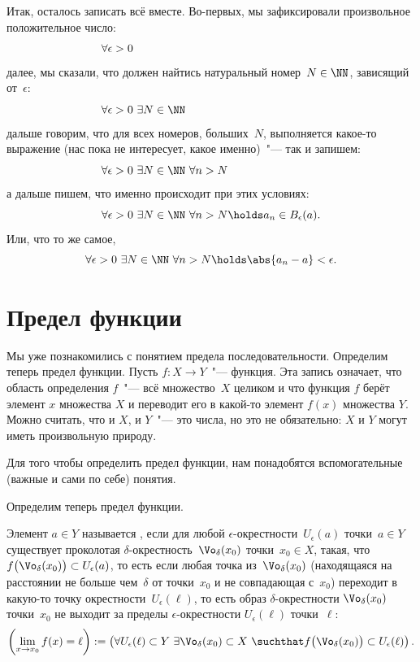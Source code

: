 Итак, осталось записать всё вместе. Во-первых, мы зафиксировали произвольное положительное число:
\[
	\forall \epsilon > 0
	\hphantom{%
		\ 
		\exists N \in \NN\ 
		\forall n > N
		\holds
		a_n \in B_\epsilon(a)
		.%
	}
\]
далее, мы сказали, что должен найтись натуральный номер~$N \in \NN$, зависящий от~$\epsilon$:
\[
	\forall \epsilon > 0\ 
	\exists N \in \NN
	\hphantom{%
		\ 
		\forall n > N
		\holds
		a_n \in B_\epsilon(a)
		.%
	}
\]
дальше говорим, что для всех номеров, больших~$N$, выполняется какое-то выражение (нас пока не интересует, какое именно)~"--- так и запишем:
\[
	\forall \epsilon > 0\ 
	\exists N \in \NN\ 
	\forall n > N
	\hphantom{%
		\holds
		a_n \in B_\epsilon(a)
		.%
	}
\]
а дальше пишем, что именно происходит при этих условиях:
\[
	\forall \epsilon > 0\ 
	\exists N \in \NN\ 
	\forall n > N
	\holds
	a_n \in B_\epsilon(a)
	.
\]
Или, что то же самое,
\[
	\forall \epsilon > 0\ 
	\exists N \in \NN\ 
	\forall n > N
	\holds
	\abs{a_n - a} < \epsilon
	.
\]


\section{Предел функции}

Мы уже познакомились с понятием предела последовательности. Определим теперь предел функции. Пусть $f \colon X \to Y$~"--- функция. Эта запись означает, что область определения $f$~"--- всё множество~$X$ целиком и что функция $f$ берёт элемент $x$ множества $X$ и переводит его в какой-то элемент $f(x)$ множества $Y$. Можно считать, что и $X$, и $Y$~"--- это числа, но это не обязательно: $X$ и $Y$ могут иметь произвольную природу.

Для того чтобы определить предел функции, нам понадобятся вспомогательные (важные и сами по себе) понятия.


Определим теперь предел функции.

\begin{definition}
	Элемент $a \in Y$ называется , если для любой $\epsilon$-окрестности~$U_\epsilon(a)$
	точки~$a \in Y$ существует проколотая
	$\delta$-окрестность~$\Vo_\delta(x_0)$ точки~$x_0 \in X$, такая, что $f
	\bigl( \Vo_\delta(x_0) \bigr) \subset U_\epsilon(a)$, то есть если любая
	точка из~$\Vo_\delta(x_0)$ (находящаяся на расстоянии не больше чем~$\delta$
	от точки~$x_0$ и не совпадающая с~$x_0$) переходит в какую-то точку
	окрестности~$U_\epsilon(\ell)$, то есть образ $\delta$-окрестности
	$\Vo_\delta(x_0)$ точки~$x_0$ не выходит за пределы $\epsilon$-окрестности
	$U_\epsilon(\ell)$ точки~$\ell$:
	\[
		\left( 
			\lim_{x \to x_0} f(x) = \ell
		\right)
		:=
		\left( 
			\forall U_\epsilon(\ell) \subset Y\ 
			\exists \Vo_\delta(x_0) \subset X\ 
			\suchthat
			f \bigl( \Vo_\delta(x_0) \bigr) \subset
			U_\epsilon(\ell)
		\right)
		.
	\]
\end{definition}

